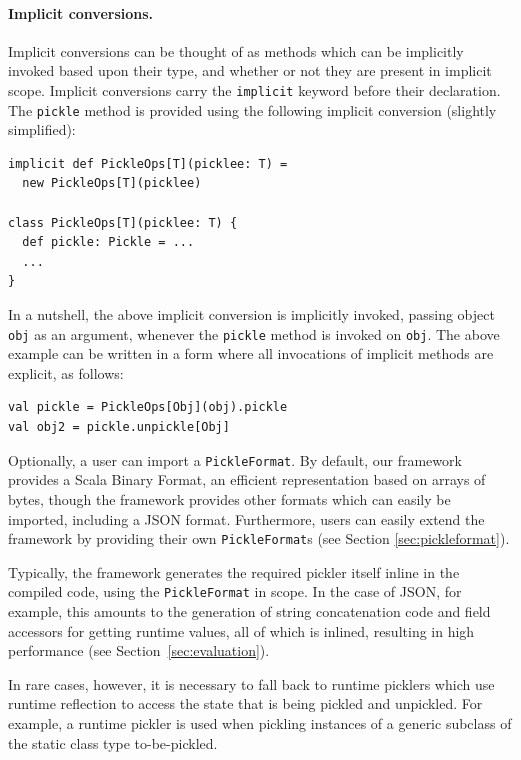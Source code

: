 \documentclass[preprint,10pt]{sigplanconf}
\theoremstyle{definition}
\theoremstyle{definition}
\newcommand{\term}[1]{\mbox{\texttt{#1}}}
\begin{document}
\paragraph{Implicit conversions.} Implicit conversions can be thought of as
methods which can be implicitly invoked based upon their type, and whether or
not they are present in implicit scope. Implicit conversions carry the
\term{implicit} keyword before their declaration. The \verb|pickle| method is
provided using the following implicit conversion (slightly simplified):

\begin{lstlisting}
implicit def PickleOps[T](picklee: T) =
  new PickleOps[T](picklee)

class PickleOps[T](picklee: T) {
  def pickle: Pickle = ...
  ...
}
\end{lstlisting}

In a nutshell, the above implicit conversion is implicitly invoked, passing
object \verb|obj| as an argument, whenever the \verb|pickle| method is invoked
on \verb|obj|. The above example can be written in a form where all
invocations of implicit methods are explicit, as follows:

\begin{lstlisting}
val pickle = PickleOps[Obj](obj).pickle
val obj2 = pickle.unpickle[Obj]
\end{lstlisting}


Optionally, a user can
import a \term{PickleFormat}. By default, our framework provides a
Scala Binary Format, an efficient representation based on arrays of bytes,
though the framework provides other formats which can easily be imported,
including a JSON format. Furthermore, users can easily extend the framework by
providing their own \term{PickleFormat}s (see Section \ref{sec:pickleformat}).

Typically, the framework generates the required pickler itself inline in the
compiled code, using the \term{PickleFormat} in scope. In the case of JSON,
for example, this amounts to the generation of string concatenation code and
field accessors for getting runtime values, all of which is inlined, resulting
in high performance (see Section~\ref{sec:evaluation}).

In rare cases, however, it is necessary to fall back to runtime picklers which
use runtime reflection to access the state that is being pickled and
unpickled. For example, a runtime pickler is used when pickling instances of a
generic subclass of the static class type to-be-pickled.
\end{document}

